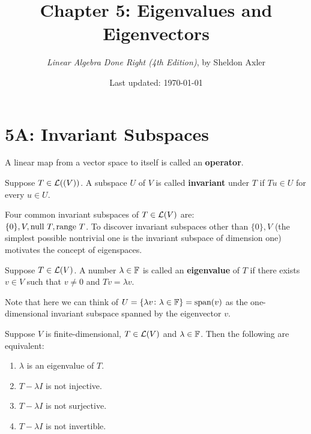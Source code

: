 \documentclass{extarticle}
\title{\vspace{-2em}Chapter 5: Eigenvalues and Eigenvectors}
\author{\emph{Linear Algebra Done Right (4th Edition)}, by Sheldon Axler}
\date{Last updated: \today}
\begin{document}
\maketitle 
\tableofcontents
\newpage 


\section*{5A: Invariant Subspaces}

\begin{definition}[operator]
    A linear map from a vector space to itself is called an \textbf{operator}. 
\end{definition}

\begin{definition}
    Suppose \(T \in \mathcal{L}((V))\). A subspace \(U\) of \(V\) is called \textbf{invariant}
    under \(T\) if \(Tu \in U\) for every \(u \in U\).
\end{definition}

\begin{remark}
    Four common invariant subspaces of \(T \in \mathcal{L}(V)\) are: \\ 
    \(\{0\}, V, \text{null } T, \text{range } T\). To discover invariant subspaces 
    other than \(\{0\}, V\) (the simplest possible nontrivial 
    one is the invariant subspace of dimension one) 
    motivates the concept 
    of eigenspaces. 
\end{remark}

\begin{definition}[eigenvalue]
    Suppose \(T \in \mathcal{L}(V)\). A number \(\lambda \in \mathbb{F}\) is called an \textbf{eigenvalue}
    of \(T\) if there exists \(v \in V\) such that \(v \neq 0\) and \(Tv=\lambda v\). 
\end{definition}

\begin{remark}
    Note that here we can think of \(U = \{\lambda v \colon \lambda \in \mathbb{F}\} = \text{span}(v)\)
    as the one-dimensional invariant subspace spanned by the eigenvector \(v\). 
\end{remark}

\begin{lemma}
    Suppose \(V\) is finite-dimensional, \(T \in \mathcal{L}(V)\) and \(\lambda \in \mathbb{F}\). Then 
    the following are equivalent:
    \begin{enumerate}[label=(\alph*)]
        \item \(\lambda\) is an eigenvalue of \(T\).
        \item \(T - \lambda I\) is not injective. 
        \item \(T - \lambda I\) is not surjective. 
        \item \(T - \lambda I\) is not invertible. 
    \end{enumerate}
\end{lemma}
\end{document}
